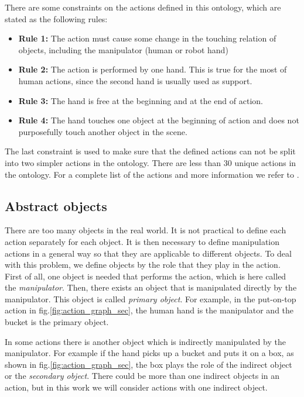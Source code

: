 There are some constraints on the actions defined in this ontology, which are stated as the following rules:
\begin{itemize}
 \item \textbf{Rule 1:} The action must cause some change in the touching relation of objects, including the manipulator (human or robot hand)
 \item \textbf{Rule 2:} The action is performed by one hand. This is true for the most of human actions, since the second hand is usually used as support.
 \item \textbf{Rule 3:} The hand is free at the beginning and at the end of action.
 \item \textbf{Rule 4:} The hand touches one object at the beginning of action and does not purposefully touch another object in the scene.
\end{itemize}

The last constraint is used to make sure that the defined actions can not be split into two simpler actions in the ontology.
There are less than 30 unique actions in the ontology.
For a complete list of the actions and more information we refer to \cite{TAMD13}.

\subsection{Abstract objects}

There are too many objects in the real world.
It is not practical to define each action separately for each object.
It is then necessary to define manipulation actions in a general way so that they are applicable to different objects.
To deal with this problem, we define objects by the role that they play in the action.
First of all, one object is needed that performs the action, which is here called the \textit{manipulator}.
Then, there exists an object that is manipulated directly by the manipulator.
This object is called \textit{primary object}.
For example, in the put-on-top action in fig.\ref{fig:action_graph_sec}, the human hand is the manipulator and the bucket is the primary object.

In some actions there is another object which is indirectly manipulated by the manipulator.
For example if the hand picks up a bucket and puts it on a box, as shown in fig.\ref{fig:action_graph_sec},
the box plays the role of the indirect object or the \textit{secondary object}.
There could be more than one indirect objects in an action, but in this work we will consider actions with one indirect object.

